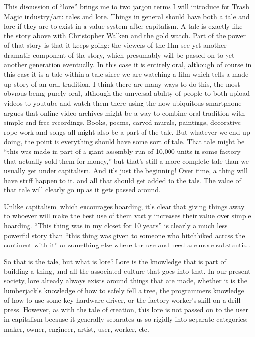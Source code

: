 This discussion of ``lore'' brings me to two jargon terms I will
introduce for Trash Magic industry/art: tales and lore. Things in
general should have both a tale and lore if they are to exist in a value
system after capitalism. A tale is exactly like the story above with
Christopher Walken and the gold watch. Part of the power of that story
is that it keeps going: the viewers of the film see yet another dramatic
component of the story, which presumably will be passed on to yet
another generation eventually. In this case it is entirely oral,
although of course in this case it is a tale within a tale since we are
watching a film which tells a made up story of an oral tradition. I
think there are many ways to do this, the most obvious being purely
oral, although the universal ability of people to both upload videos to
youtube and watch them there using the now-ubiquitous smartphone argues
that online video archives might be a way to combine oral tradition with
simple and free recordings. Books, poems, carved murals, paintings,
decorative rope work and songs all might also be a part of the tale. But
whatever we end up doing, the point is everything should have some sort
of tale. That tale might be ``this was made in part of a giant assembly
run of 10,000 units in some factory that actually sold them for money,''
but that's still a more complete tale than we usually get under
capitalism. And it's just the beginning! Over time, a thing will have
stuff happen to it, and all that should get added to the tale. The value
of that tale will clearly go up as it gets passed around.

Unlike capitalism, which encourages hoarding, it's clear that giving
things away to whoever will make the best use of them vastly increases
their value over simple hoarding. ``This thing was in my closet for 10
years'' is clearly a much less powerful story than ``this thing was
given to someone who hitchhiked across the continent with it'' or
something else where the use and need are more substantial.

So that is the tale, but what is lore? Lore is the knowledge that is
part of building a thing, and all the associated culture that goes into
that. In our present society, lore already always exists around things
that are made, whether it is the lumberjack's knowledge of how to safely
fell a tree, the programmers knowledge of how to use some key hardware
driver, or the factory worker's skill on a drill press. However, as with
the tale of creation, this lore is not passed on to the user in
capitalism because it generally separates us so rigidly into separate
categories: maker, owner, engineer, artist, user, worker, etc.

